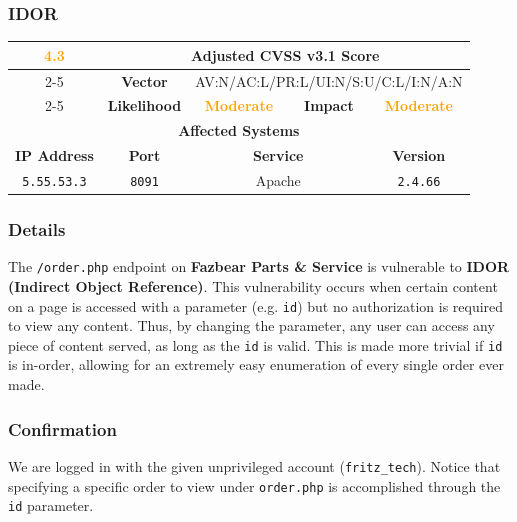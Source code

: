 \documentclass[12pt, letterpaper]{article}
\begin{document}
\clearpage
\subsubsection{IDOR}

\begin{table}[!ht]
  \centering
  \renewcommand{\arraystretch}{1.8} %
  \begin{tabular}{|c|c|c|c|c|}
    \hline
    \multirow{3}{*}{\textcolor{orange}{\textbf{\huge 4.3}}} &
    \multicolumn{4}{c|}{\textbf{Adjusted CVSS v3.1 Score}} \\ \cline{2-5}
    & \textbf{Vector} &
    \multicolumn{3}{c|}{AV:N/AC:L/PR:L/UI:N/S:U/C:L/I:N/A:N} \\ \cline{2-5}
    & \textbf{Likelihood} & \textcolor{orange}{\textbf{Moderate}}
    & \textbf{Impact} & \textcolor{orange}{\textbf{Moderate}} \\ \hline
    \multicolumn{5}{|c|}{\textbf{Affected Systems}} \\ \hline
    \textbf{IP Address} & \textbf{Port} &
    \multicolumn{2}{c|}{\textbf{Service}} & \textbf{Version} \\ \hline
    \texttt{5.55.53.3} & \texttt{8091} & \multicolumn{2}{c|}{Apache}
    & \texttt{2.4.66} \\ \hline
  \end{tabular}
\end{table}
\FloatBarrier

\subsubsection*{Details}

The \texttt{/order.php} endpoint on \textbf{Fazbear Parts \& Service}
is vulnerable to \textbf{IDOR (Indirect Object Reference)}. This
vulnerability occurs when certain content on a page is accessed with
a parameter (e.g. \texttt{id}) but no authorization is
required to view any content. Thus, by changing the parameter, any
user can access any piece of content served, as long as the
\texttt{id} is valid. This is made more trivial if
\texttt{id} is in-order, allowing for an extremely easy
enumeration of every single order ever made.

\subsubsection*{Confirmation}

We are logged in with the given unprivileged account
(\texttt{fritz\_tech}). Notice that specifying a specific order to
view under \texttt{order.php} is accomplished through the \texttt{id} parameter.
\end{document}
